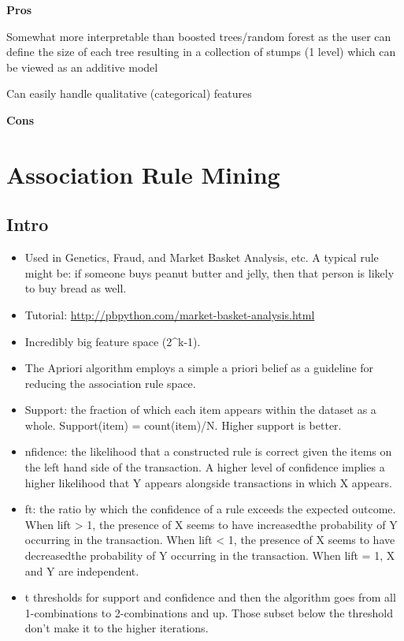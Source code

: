 \documentclass[]{book}
\begin{document}
\textbf{Pros}

Somewhat more interpretable than boosted trees/random forest as the user can define the size of each tree resulting in a collection of stumps (1 level) which can be viewed as an additive model

Can easily handle qualitative (categorical) features

\textbf{Cons}

\hypertarget{association-rule-mining}{%
\section{Association Rule Mining}\label{association-rule-mining}}

\hypertarget{intro-9}{%
\subsection{Intro}\label{intro-9}}

\begin{itemize}
\item
  Used in Genetics, Fraud, and Market Basket Analysis, etc. A typical rule might be: if someone buys peanut butter and jelly, then that person is likely to buy bread as well.
\item
  Tutorial: \url{http://pbpython.com/market-basket-analysis.html}
\item
  Incredibly big feature space (2\^{}k-1).
\item
  The Apriori algorithm employs a simple a priori belief as a guideline for reducing the association rule space.
\item
  Support: the fraction of which each item appears within the dataset as a whole. Support(item) = count(item)/N. Higher support is better.
\item
  nfidence: the likelihood that a constructed rule is correct given the items on the left hand side of the transaction. A higher level of confidence implies a higher likelihood that Y appears alongside transactions in which X appears.
\item
  ft: the ratio by which the confidence of a rule exceeds the expected outcome. When lift \textgreater{} 1, the presence of X seems to have increasedthe probability of Y occurring in the transaction. When lift \textless{} 1, the presence of X seems to have decreasedthe probability of Y occurring in the transaction. When lift = 1, X and Y are independent.
\item
  t thresholds for support and confidence and then the algorithm goes from all 1-combinations to 2-combinations and up. Those subset below the threshold don't make it to the higher iterations.
\end{itemize}
\end{document}

